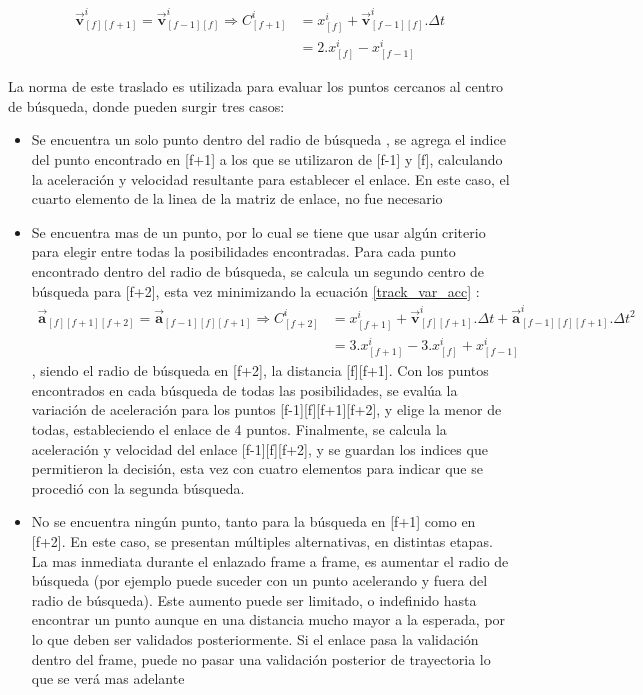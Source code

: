 \begin{equation}
\begin{split}
\boldsymbol{\overrightarrow{v}}_{[f][f+1]}^{i} = \boldsymbol{\overrightarrow{v}}_{[f-1][f]}^{i} \Rightarrow C_{[f+1]}^{i} &= x_{[f]}^{i} + \boldsymbol{\overrightarrow{v}}_{[f-1][f]}^{i}.\Delta{t} \\
&= 2.x_{[f]}^{i} -x_{[f-1]}^{i} 
\end{split}
\label{centro_busqueda_f1}
\end{equation}

La norma de este traslado es utilizada para evaluar los puntos cercanos al centro de búsqueda, donde pueden surgir tres casos:

\begin{itemize}
\item Se encuentra un solo punto dentro del radio de búsqueda , se agrega el indice del punto encontrado en [f+1] a los que se utilizaron de [f-1] y [f], calculando la aceleración y velocidad resultante para establecer el enlace. En este caso, el cuarto elemento de la linea de la matriz de enlace, no fue necesario 
\item Se encuentra mas de un punto, por lo cual se tiene que usar algún criterio para elegir entre todas la posibilidades encontradas. Para cada punto encontrado dentro del radio de búsqueda, se calcula un segundo centro de búsqueda para [f+2], esta vez minimizando la ecuación \ref{track_var_acc} :
\begin{equation}
\begin{split}
\boldsymbol{\overrightarrow{a}}_{[f][f+1][f+2]}=\boldsymbol{\overrightarrow{a}}_{[f-1][f][f+1]} \Rightarrow C_{[f+2]}^{i} &= x_{[f+1]}^{i} + \boldsymbol{\overrightarrow{v}}_{[f][f+1]}^{i}.\Delta{t} + \boldsymbol{\overrightarrow{a}}_{[f-1][f][f+1]}^{i}.\Delta{t}^2\\
&= 3.x_{[f+1]}^{i} - 3.x_{[f]}^{i} + x_{[f-1]}^{i}\end{split}
\label{centro_busqueda_f2}
\end{equation}
, siendo el radio de búsqueda en [f+2], la distancia [f][f+1]. Con los puntos encontrados en cada búsqueda de todas las posibilidades, se evalúa la variación de aceleración para los puntos [f-1][f][f+1][f+2], y elige la menor de todas, estableciendo el enlace de 4 puntos. Finalmente, se calcula la aceleración y velocidad del enlace [f-1][f][f+2], y se guardan los indices que permitieron la decisión, esta vez con cuatro elementos para indicar que se procedió con la segunda búsqueda.
\item No se encuentra ningún punto, tanto para la búsqueda en [f+1] como en [f+2]. En este caso, se presentan múltiples alternativas, en distintas etapas. La mas inmediata durante el enlazado frame a frame, es aumentar el radio de búsqueda (por ejemplo puede suceder con un punto acelerando y fuera del radio de búsqueda). Este aumento puede ser limitado, o indefinido hasta encontrar un punto aunque en una distancia mucho mayor a la esperada, por lo que deben ser validados posteriormente. Si el enlace pasa la validación dentro del frame, puede no pasar una validación posterior de trayectoria lo que se verá mas adelante
\end{itemize}

